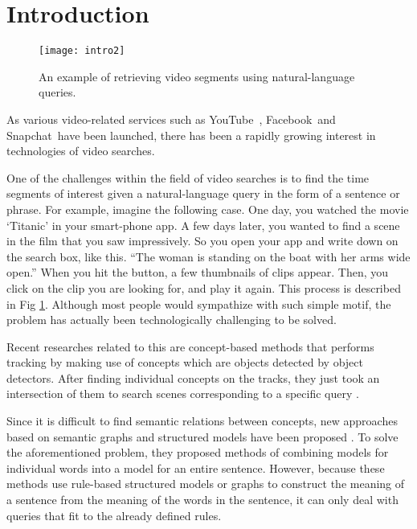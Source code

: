 \section{Introduction}

\begin{figure}
\texttt{[image: intro2]}
\caption{An example of retrieving video segments using natural-language queries.}
\label{fig:intro}
\end{figure}


As various video-related services such as YouTube\circledR\ , Facebook\circledR\ and Snapchat\circledR\ have been launched, there has been a rapidly growing interest in technologies of video searches. 

One of the challenges within the field of video searches is to find the time segments of interest given a natural-language query in the form of a sentence or phrase. For example, imagine the following case. One day, you watched the movie `Titanic' in your smart-phone app. A few days later, you wanted to find a scene in  the film that you saw impressively. So you open your app and write down on the search box, like this. ``The woman is standing on the boat with her arms wide open.'' When you hit the button, a few thumbnails of clips appear. Then, you click on the clip you are looking for, and play it again. This process is described in Fig \textcolor{red}{\ref{fig:intro}}. Although most people would sympathize with such simple motif, the problem has actually been technologically challenging to be solved.  

Recent researches related to this are concept-based methods that performs tracking by making use of concepts which are objects detected by object detectors. After finding individual concepts on the tracks, they just took an intersection of them to search scenes corresponding to a specific query \cite{christel2004exploiting, worring2007mediamill, snoek2007learned, tapaswi2014story, aytar2008utilizing}.

Since it is difficult to find semantic relations between concepts, new approaches based on semantic graphs and structured models have been proposed \cite{lin2014visual, barrett2016saying}. To solve the aforementioned problem, they proposed methods of combining models for individual words into a model for an entire sentence. However, because these methods use rule-based structured models or graphs to construct the meaning of a sentence from the meaning of the words in the sentence, it can only deal with queries that fit to the already defined rules. 

